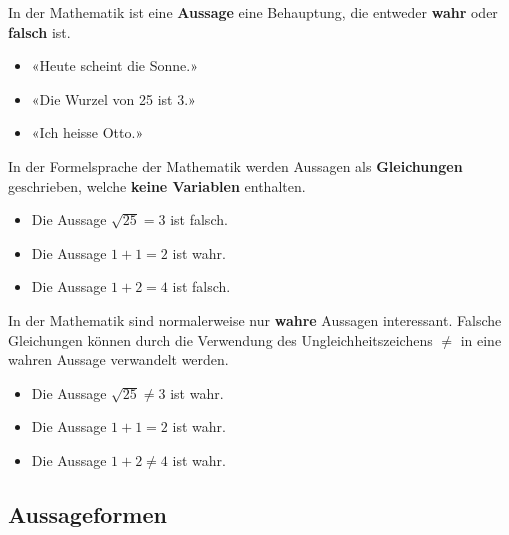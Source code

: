 In der Mathematik ist eine \textbf{Aussage} eine Behauptung, die entweder \textbf{wahr} oder \textbf{falsch} ist.
\begin{example}
  \begin{itemize}[noitemsep]
    \item «Heute scheint die Sonne.»
    \item «Die Wurzel von 25 ist 3.»
    \item «Ich heisse Otto.»
  \end{itemize}
\end{example}
In der Formelsprache der Mathematik werden Aussagen als \textbf{Gleichungen} geschrieben, welche \textbf{keine Variablen} enthalten.
\begin{example}
  \begin{itemize}[noitemsep]
    \item Die Aussage $\sqrt{25} = 3$ ist falsch.
    \item Die Aussage $1+1 = 2$ ist wahr.
    \item Die Aussage $1+2 = 4$ ist falsch.
  \end{itemize}
\end{example}
In der Mathematik sind normalerweise nur \textbf{wahre} Aussagen interessant. Falsche Gleichungen können durch die Verwendung des Ungleichheitszeichens $\ne$ in eine wahren Aussage verwandelt werden.
\begin{example}
  \begin{itemize}[noitemsep]
    \item Die Aussage $\sqrt{25} \ne 3$ ist wahr.
    \item Die Aussage $1+1 = 2$ ist wahr.
    \item Die Aussage $1+2 \ne 4$ ist wahr.
  \end{itemize}
\end{example}

\subsection{Aussageformen}

